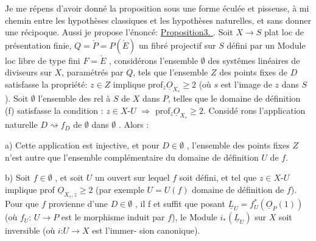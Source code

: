 Je me répens d'avoir donné la proposition  sous une forme éculée et
pisseuse, à mi chemin entre  les hypothèses classiques et les hypothèses
naturelles, et sans donner une récipoque. Aussi je propose l'énoncé:
\uline{Proposition3. }.  Soit $X \to S$ plat loc de présentation
finie,  $Q=\check{P} = P(\check{E})$  un fibré  projectif sur $S$ défini par
un Module loc  libre de type fini $F = \check{E}$ ,  considérons l'ensemble
$\emptyset$  des systêmes linéaires  de diviseurs  sur $X$, paramétrés par $Q$, tels
que l'ensemble  $Z$ des points fixes de $D$  satisfasse la propriété: $z \in Z$
implique prof$_z \underline{O}_{X_s} \geqslant 2$  (où  $s$  est l'image de $z$ dans $S$). 
  Soit $\emptyset$ l'ensemble des   rel à
$S$ \deleted{\unsure{*}} de $X$ dans  $P$, telles que le domaine de définition (f)
 satisfasse la condition : $z \in X$-$U$ $\Longrightarrow$ prof$_z \underline{O}_{X_s} \geqslant 2$. Considé
rons l'application naturelle  $D \rightsquigarrow f_D$  de $\emptyset$  dans $\emptyset$ .  Alors :

a)  Cette application est injective,  et  pour $D \in \emptyset$ , l'ensemble des
points fixes $Z$  n'est autre que l'ensemble  complémentaire du domaine de
définition  $U$ de $f$.

b)   Soit
$f \in \emptyset$ , et soit $U$ un ouvert sur lequel $f$ soit défini, et tel que $z \in X$-$U$
implique prof $\underline{O}_{X_s,z} \geqslant 2$  (par exemple $U = U(f)$ domaine de
définition de $f$). Pour que $f$ provienne d'une $D \in \emptyset$ , il f et suffit  que\hand{\unsure{$\surd$}}
posant $\underline{L}_U = f_U^*(\underline{O}_P(1))$  (où  $f_U$: $U \to P$  est le morphisme induit par $f$),
 le Module  $i_*(\underline{L}_U)$  sur $X$ soit inversible (où $i$:$U \to X$ est l'immer-%
sion canonique).

